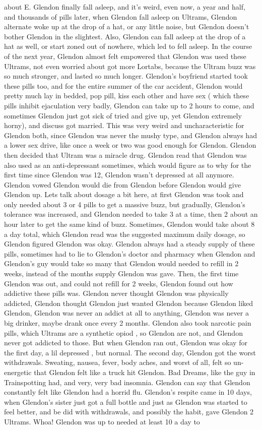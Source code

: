 \documentclass[12pt]{book}
\begin{document}
about E. Glendon finally fall asleep, and it's weird, even now, a year and half, and thousands of pills later, when Glendon fall asleep on Ultrams, Glendon alternate woke up at the drop of a hat, or any little noise, but Glendon doesn't bother Glendon in the slightest. Also, Glendon can fall asleep at the drop of a hat as well, or start zoned out of nowhere, which led to fell asleep. In the course of the next year, Glendon almost felt empowered that Glendon was used these Ultrams, not even worried about got more Lortabs, because the Ultram buzz was so much stronger, and lasted so much longer. Glendon's boyfriend started took these pills too, and for the entire summer of the car accident, Glendon would pretty much lay in bedded, pop pill, kiss each other and have sex ( which these pills inhibit ejaculation very badly, Glendon can take up to 2 hours to come, and sometimes Glendon just got sick of tried and give up, yet Glendon extremely horny), and discuss got married. This was very weird and uncharacteristic for Glendon both, since Glendon was never the mushy type, and Glendon always had a lower sex drive, like once a week or two was good enough for Glendon. Glendon then decided that Ultram was a miracle drug. Glendon read that Glendon was also used as an anti-depressant sometimes, which would figure as to why for the first time since Glendon was 12, Glendon wasn't depressed at all anymore. Glendon vowed Glendon would die from Glendon before Glendon would give Glendon up. Lets talk about dosage a bit here, at first Glendon was took and only needed about 3 or 4 pills to get a massive buzz, but gradually, Glendon's tolerance was increased, and Glendon needed to take 3 at a time, then 2 about an hour later to get the same kind of buzz. Sometimes, Glendon would take about 8 a day total, which Glendon read was the suggested maximum daily dosage, so Glendon figured Glendon was okay. Glendon always had a steady supply of these pills, sometimes had to lie to Glendon's doctor and pharmacy when Glendon and Glendon's guy would take so many that Glendon would needed to refill in 2 weeks, instead of the months supply Glendon was gave. Then, the first time Glendon was out, and could not refill for 2 weeks, Glendon found out how addictive these pills was. Glendon never thought Glendon was physically addicted, Glendon thought Glendon just wanted Glendon because Glendon liked Glendon, Glendon was never an addict at all to anything, Glendon was never a big drinker, maybe drank once every 2 months. Glendon also took narcotic pain pills, which Ultrams are a synthetic opiod , so Glendon are not, and Glendon never got addicted to those. But when Glendon ran out, Glendon was okay for the first day, a lil depressed , but normal. The second day, Glendon got the worst withdrawals. Sweating, nausea, fever, body aches, and worst of all, felt so un-energetic that Glendon felt like a truck hit Glendon. Bad Dreams, like the guy in Trainspotting had, and very, very bad insomnia. Glendon can say that Glendon constantly felt like Glendon had a horrid flu. Glendon's respite came in 10 days, when Glendon's sister just got a full bottle and just as Glendon was started to feel better, and be did with withdrawals, and possibly the habit, gave Glendon 2 Ultrams. Whoa! Glendon was up to needed at least 10 a day to 
\end{document}
